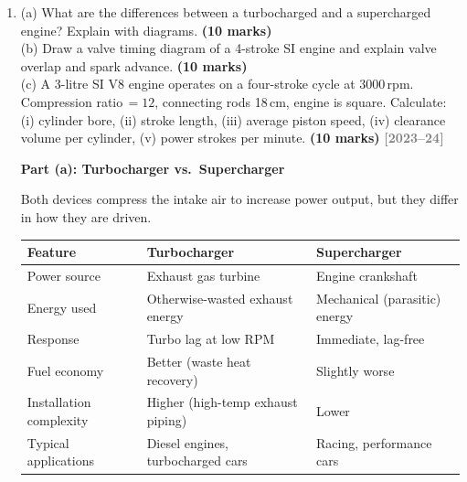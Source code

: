 \documentclass[12pt,a3paper]{article}
\newcommand{\yr}[1]{\hfill\textcolor{gray}{\small\textbf{[#1]}}}
\newcommand{\mk}[1]{\textcolor{orange!70!black}{\small\textbf{(#1 marks)}}}
\begin{document}
\begin{enumerate}
\begin{tcolorbox}[enhanced,breakable,ansbox,colback=cB!4,colframe=cB,
  boxrule=0.8pt,arc=5pt,
  title={\textbf{Answer}},fonttitle=\bfseries\color{white},colbacktitle=cB]
\end{tcolorbox}

\item \label{qlabel:A2-Q2}
(a) What are the differences between a turbocharged and a supercharged engine? Explain with diagrams. \mk{10}\\
(b) Draw a valve timing diagram of a 4-stroke SI engine and explain valve overlap and spark advance. \mk{10}\\
(c) A 3-litre SI V8 engine operates on a four-stroke cycle at 3000\,rpm. Compression ratio\,$= 12$, connecting rods 18\,cm, engine is square. Calculate: (i) cylinder bore, (ii) stroke length, (iii) average piston speed, (iv) clearance volume per cylinder, (v) power strokes per minute. \mk{10}
\yr{2023--24}

\begin{tcolorbox}[enhanced,breakable,ansbox,colback=cB!4,colframe=cB,
  boxrule=0.8pt,arc=5pt,
  title={\textbf{Answer}},fonttitle=\bfseries\color{white},colbacktitle=cB]

\textbf{Part (a): Turbocharger vs.\ Supercharger}

Both devices compress the intake air to increase power output, but they differ in
how they are driven.

\begin{center}
\small
\begin{tabularx}{\linewidth}{@{}llX@{}}
\toprule
\textbf{Feature}        & \textbf{Turbocharger}              & \textbf{Supercharger} \\
\midrule
Power source            & Exhaust gas turbine                & Engine crankshaft \\
Energy used             & Otherwise-wasted exhaust energy    & Mechanical (parasitic) energy \\
Response                & Turbo lag at low RPM               & Immediate, lag-free \\
Fuel economy            & Better (waste heat recovery)       & Slightly worse \\
Installation complexity & Higher (high-temp exhaust piping)  & Lower \\
Typical applications    & Diesel engines, turbocharged cars  & Racing, performance cars \\
\bottomrule
\end{tabularx}
\end{center}


\end{tcolorbox}
\end{enumerate}
\end{document}
